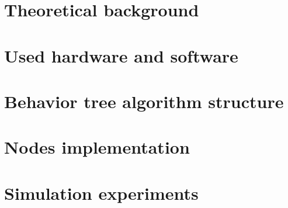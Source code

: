 \documentclass{ctuthesis}
\begin{document}
    \maketitle

    

    \chapter{Theoretical background}
        
        
        
        

    \chapter{Used hardware and software}
        
        
                

    \chapter{Behavior tree algorithm structure}
        

    \chapter{Nodes implementation}
        
        
        
        
    \chapter{Simulation experiments}
        




    \appendix
        

        \printbibliography
\end{document}
